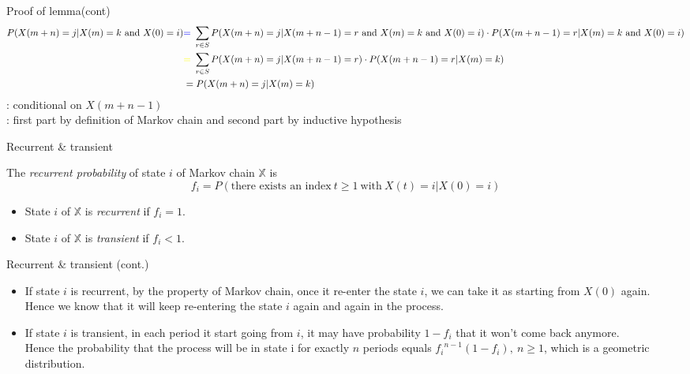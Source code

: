 \documentclass[mathserif]{beamer}
\begin{document}
\begin{frame}{Proof of lemma(cont)}
	\begin{align*}
	P(X(m+n) = j | X(m) = k \text{ and } X(0) = i) 
		&\text{\color{blue}{=} } \sum_{r \in S} P(X(m+n) = j | X(m+n-1) = r \text{ and } X(m) = k \text{ and } X(0) = i) \cdot P(X(m+n-1) = r | X(m) = k \text{ and } X(0) = i)\\
		&\text{\color{yellow}{=} } \sum_{r \in S} P(X(m+n) = j | X(m+n-1) = r) \cdot P(X(m+n-1) = r | X(m) = k) \\
		&= P(X(m+n) = j | X(m) = k)
	\end{align*}
	\color{blue}{=}: conditional on $X(m+n-1)$ \\
	\color{yellow}{=}: first part by definition of Markov chain and second part by inductive hypothesis \\
\end{frame}

\begin{frame}{Recurrent \& transient}
	\begin{definition}
	The \textit{recurrent probability} of state $i$ of Markov chain $\mathbb{X}$ is 
	\[
	f_i = P(\text{there exists an index}~t \geq 1~\text{with}~X(t)=i | X(0)=i)
	\]
	\begin{itemize}
	\item State $i$ of $\mathbb{X}$ is \textit{recurrent} if $f_i = 1$.
	\item State $i$ of $\mathbb{X}$ is \textit{transient} if $f_i < 1$.
	\end{itemize}
	\end{definition}
\end{frame}

\begin{frame}{Recurrent \& transient (cont.)}
	\begin{itemize}
	\item If state $i$ is recurrent, by the property of Markov chain, 
		once it re-enter the state $i$, we can take it as starting from $X(0)$ again. \\
		Hence we know that it will keep re-entering the state $i$ again and again in the process.
	\item If state $i$ is transient, in each period it start going from $i$,
		it may have probability $1 - f_i$ that it won't come back anymore. \\
		Hence the probability that the process will be in state i for exactly $n$ periods equals
		${f_i}^{n-1}(1-f_i), ~n \geq 1$, which is a geometric distribution.
	\end{itemize}
\end{frame}
\end{document}
